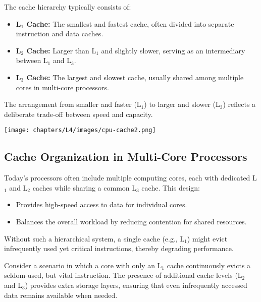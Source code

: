 \documentclass[../../compsys.tex]{subfiles}
\begin{document}
\begin{definition}
The cache hierarchy typically consists of:
\begin{itemize}
    \item \textbf{L\(_1\) Cache:} The smallest and fastest cache, often divided into separate instruction and data caches.
    \item \textbf{L\(_2\) Cache:} Larger than L\(_1\) and slightly slower, serving as an intermediary between L\(_1\) and L\(_3\).
    \item \textbf{L\(_3\) Cache:} The largest and slowest cache, usually shared among multiple cores in multi-core processors.
\end{itemize}
\end{definition}

The arrangement from smaller and faster (L\(_1\)) to larger and slower (L\(_3\)) reflects a deliberate trade-off between speed and capacity.

\begin{center}
  \texttt{[image: chapters/L4/images/cpu-cache2.png]}
\end{center}

\subsection{Cache Organization in Multi-Core Processors}
Today's processors often include multiple computing cores, each with dedicated L\(_1\) and L\(_2\) caches while sharing a common L\(_3\) cache. This design:
\begin{itemize}
    \item Provides high-speed access to data for individual cores.
    \item Balances the overall workload by reducing contention for shared resources.
\end{itemize}
Without such a hierarchical system, a single cache (e.g., L\(_1\)) might evict infrequently used yet critical instructions, thereby degrading performance.

\begin{example}
Consider a scenario in which a core with only an L\(_1\) cache continuously evicts a seldom-used, but vital instruction. The presence of additional cache levels (L\(_2\) and L\(_3\)) provides extra storage layers, ensuring that even infrequently accessed data remains available when needed.
\end{example}
\end{document}
